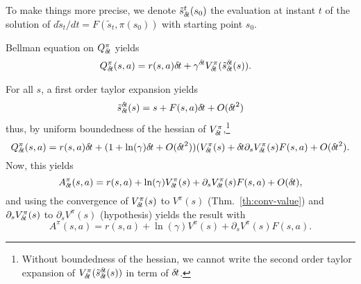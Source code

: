 To make things more precise, we denote $\tilde{s}_{\delta\hspace{-.1em}t}^t(s_0)$ the
evaluation at instant $t$ of the solution of $d\tilde{s}_t/dt = F(\tilde{s}_t,
\pi(s_0))$ with starting point $s_0$.

Bellman equation on $Q^\pi_{\delta\hspace{-.1em}t}$ yields
\begin{align}
	Q^\pi_{\delta\hspace{-.1em}t}(s, a) &= r(s, a) {\delta\hspace{-.1em}t} + \gamma^{\delta\hspace{-.1em}t} V^\pi_{\delta\hspace{-.1em}t}(\tilde{s}_{\delta\hspace{-.1em}t}^{\delta\hspace{-.1em}t}(s)).
\end{align}

For all $s$, a first order taylor expansion yields
\begin{equation}
	\tilde{s}_{\delta\hspace{-.1em}t}^{\delta\hspace{-.1em}t}(s) = s + F(s, a){\delta\hspace{-.1em}t} + O({\delta\hspace{-.1em}t}^2)
\end{equation}
thus, by uniform boundedness of the hessian of $V^\pi_{\delta\hspace{-.1em}t}$,\footnote{
	Without boundedness of the hessian, we cannot write the second order taylor expansion of
	$V^\pi_{\delta\hspace{-.1em}t}(\tilde{s}_{\delta\hspace{-.1em}t}^{\delta\hspace{-.1em}t}(s))$ in term of ${\delta\hspace{-.1em}t}$.
}
\begin{equation}
	Q^\pi_{\delta\hspace{-.1em}t}(s, a) = r(s, a) {\delta\hspace{-.1em}t} + (1 + \ln(\gamma) {\delta\hspace{-.1em}t} + O({\delta\hspace{-.1em}t}^2)) (V^\pi_{\delta\hspace{-.1em}t}(s) + {\delta\hspace{-.1em}t} \partial_s V^\pi_{\delta\hspace{-.1em}t}(s) F(s, a) + O({\delta\hspace{-.1em}t}^2).
\end{equation}
Now, this yields
\begin{equation}
	A^\pi_{\delta\hspace{-.1em}t}(s, a) = r(s, a) + \ln(\gamma) V^\pi_{\delta\hspace{-.1em}t}(s) + \partial_s V^\pi_{\delta\hspace{-.1em}t}(s) F(s, a) + O({\delta\hspace{-.1em}t}),
\end{equation}
and using the convergence of $V^\pi_{\delta\hspace{-.1em}t}(s)$ to $V^\pi(s)$ (Thm.~\ref{th:conv-value}) and $\partial_s V^\pi_{\delta\hspace{-.1em}t}(s)$ to $\partial_s V^\pi(s)$ (hypothesis) yields the result with 
\begin{equation}
	A^\pi(s, a) = r(s, a) + \ln(\gamma) V^\pi(s) + \partial_s V^\pi(s) F(s, a).
	\label{eq:adv_function}
\end{equation}

